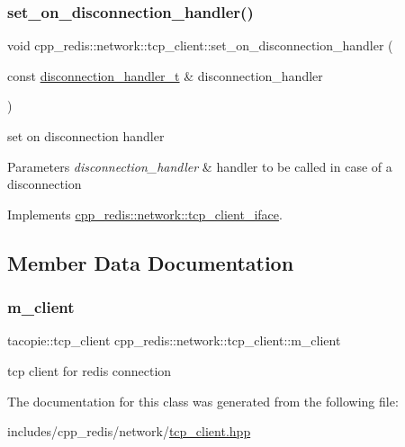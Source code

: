 \subsubsection{\texorpdfstring{set\+\_\+on\+\_\+disconnection\+\_\+handler()}{set\_on\_disconnection\_handler()}}
{\footnotesize\ttfamily void cpp\+\_\+redis\+::network\+::tcp\+\_\+client\+::set\+\_\+on\+\_\+disconnection\+\_\+handler (\begin{DoxyParamCaption}\item[{const \hyperlink{classcpp__redis_1_1network_1_1tcp__client__iface_a9a7d5942205db8be03da581a848b8ec0}{disconnection\+\_\+handler\+\_\+t} \&}]{disconnection\+\_\+handler }\end{DoxyParamCaption})\hspace{0.3cm}{\ttfamily [virtual]}}

set on disconnection handler


\begin{DoxyParams}{Parameters}
{\em disconnection\+\_\+handler} & handler to be called in case of a disconnection \\
\hline
\end{DoxyParams}


Implements \hyperlink{classcpp__redis_1_1network_1_1tcp__client__iface_acecf3b75c3849071d82478bc7a8c97a8}{cpp\+\_\+redis\+::network\+::tcp\+\_\+client\+\_\+iface}.



\subsection{Member Data Documentation}
\mbox{\label{classcpp__redis_1_1network_1_1tcp__client_a994cd8f0e7da2ebccd17ccb7cc0e1319}} 
\subsubsection{\texorpdfstring{m\+\_\+client}{m\_client}}
{\footnotesize\ttfamily tacopie\+::tcp\+\_\+client cpp\+\_\+redis\+::network\+::tcp\+\_\+client\+::m\+\_\+client\hspace{0.3cm}{\ttfamily [private]}}

tcp client for redis connection 

The documentation for this class was generated from the following file\+:\begin{DoxyCompactItemize}
\item 
includes/cpp\+\_\+redis/network/\hyperlink{tcp__client_8hpp}{tcp\+\_\+client.\+hpp}\end{DoxyCompactItemize}
